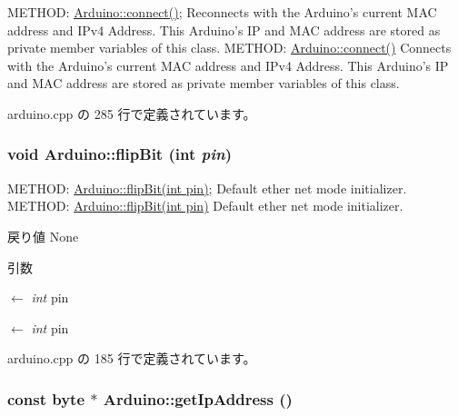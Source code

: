 METHOD: \hyperlink{classArduino_a56445661e05ebbe6fa7b30cb15f59e47_a56445661e05ebbe6fa7b30cb15f59e47}{Arduino::connect()}; Reconnects with the Arduino's current MAC address and IPv4 Address. This Arduino's IP and MAC address are stored as private member variables of this class. METHOD: \hyperlink{classArduino_a56445661e05ebbe6fa7b30cb15f59e47_a56445661e05ebbe6fa7b30cb15f59e47}{Arduino::connect()} Connects with the Arduino's current MAC address and IPv4 Address. This Arduino's IP and MAC address are stored as private member variables of this class. 

 arduino.cpp の 285 行で定義されています。\hypertarget{classArduino_a8fdf3b0eb1551c18de943099a391dc45_a8fdf3b0eb1551c18de943099a391dc45}{
\subsubsection[{flipBit}]{\setlength{\rightskip}{0pt plus 5cm}void Arduino::flipBit (int {\em pin})}}
\label{classArduino_a8fdf3b0eb1551c18de943099a391dc45_a8fdf3b0eb1551c18de943099a391dc45}


METHOD: \hyperlink{classArduino_a8fdf3b0eb1551c18de943099a391dc45_a8fdf3b0eb1551c18de943099a391dc45}{Arduino::flipBit(int pin)}; Default ether net mode initializer. METHOD: \hyperlink{classArduino_a8fdf3b0eb1551c18de943099a391dc45_a8fdf3b0eb1551c18de943099a391dc45}{Arduino::flipBit(int pin)} Default ether net mode initializer.

\begin{DoxyReturn}{戻り値}
None 
\end{DoxyReturn}

\begin{DoxyParams}{引数}
\item[\mbox{$\leftarrow$} {\em int}]pin\item[\mbox{$\leftarrow$} {\em int}]pin \end{DoxyParams}


 arduino.cpp の 185 行で定義されています。\hypertarget{classArduino_ae412da451a2a3df9b8c123b98b188b7b_ae412da451a2a3df9b8c123b98b188b7b}{
\subsubsection[{getIpAddress}]{\setlength{\rightskip}{0pt plus 5cm}const byte $\ast$ Arduino::getIpAddress ()}}
\label{classArduino_ae412da451a2a3df9b8c123b98b188b7b_ae412da451a2a3df9b8c123b98b188b7b}


